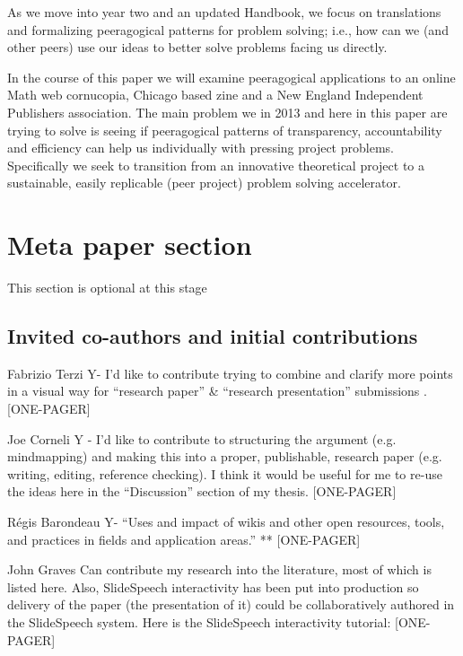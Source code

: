 \documentclass{acm_proc_article-sp}
\begin{document}
As we move into year two and an updated Handbook, we focus on translations and formalizing peeragogical patterns for problem solving; i.e., how can we (and other peers) use our ideas to better solve problems facing us directly.

In the course of this paper we will examine peeragogical applications to an online Math web cornucopia, Chicago based zine and a New England Independent Publishers association. The main problem we in 2013 and here in this paper are trying to solve is seeing if peeragogical patterns of transparency, accountability and efficiency can help us individually with pressing project problems. Specifically we seek to transition from an innovative theoretical project to a sustainable, easily replicable (peer project) problem solving accelerator.

%
%
%
%

\section{Meta paper section}

This section is optional at this stage

\subsection{Invited co-authors and initial contributions}

    Fabrizio Terzi Y- I'd like to contribute trying to combine and clarify more points in a visual way for ``research paper'' \& ``research presentation'' submissions . [ONE-PAGER]

    Joe Corneli Y - I'd like to contribute to structuring the argument (e.g. mindmapping) and making this into a proper, publishable, research paper (e.g. writing, editing, reference checking). I think it would be useful for me to re-use the ideas here in the ``Discussion'' section of my thesis. [ONE-PAGER]

    R\'egis Barondeau Y- ``Uses and impact of wikis and other open resources, tools, and practices in fields and application areas.'' ** [ONE-PAGER]

    John Graves Can contribute my research into the literature, most of which is listed here. Also, SlideSpeech interactivity has been put into production so delivery of the paper (the presentation of it) could be collaboratively authored in the SlideSpeech system. Here is the SlideSpeech interactivity tutorial: [ONE-PAGER]
\end{document}
